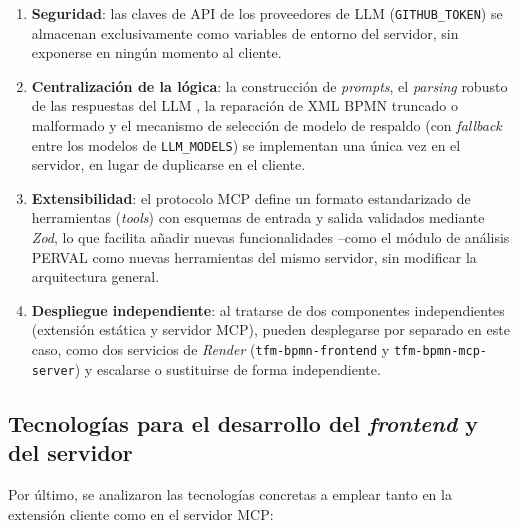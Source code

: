{\begin{enumerate}
    \item \textbf{Seguridad}: las claves de API de los proveedores de LLM (\texttt{GITHUB\_TOKEN}) se almacenan exclusivamente como variables de entorno del servidor, sin exponerse en ningún momento al cliente.
    \item \textbf{Centralización de la lógica}: la construcción de \textit{prompts}, el \textit{parsing} robusto de las respuestas del LLM , la reparación de XML BPMN truncado o malformado  y el mecanismo de selección de modelo de respaldo (con \textit{fallback} entre los modelos de \texttt{LLM\_MODELS}) se implementan una única vez en el servidor, en lugar de duplicarse en el cliente.
    \item \textbf{Extensibilidad}: el protocolo MCP define un formato estandarizado de herramientas (\textit{tools}) con esquemas de entrada y salida validados mediante \textit{Zod}, lo que facilita añadir nuevas funcionalidades --como el módulo de análisis PERVAL como nuevas herramientas del mismo servidor, sin modificar la arquitectura general.
    \item \textbf{Despliegue independiente}: al tratarse de dos componentes independientes (extensión estática y servidor MCP), pueden desplegarse por separado en este caso, como dos servicios de \textit{Render} (\texttt{tfm-bpmn-frontend} y \texttt{tfm-bpmn-mcp-server}) y escalarse o sustituirse de forma independiente.
\end{enumerate}

\subsection{Tecnologías para el desarrollo del \textit{frontend} y del servidor}
\label{subsec:tecnologiasFrontend}

Por último, se analizaron las tecnologías concretas a emplear tanto en la extensión cliente como en el servidor MCP:

}
